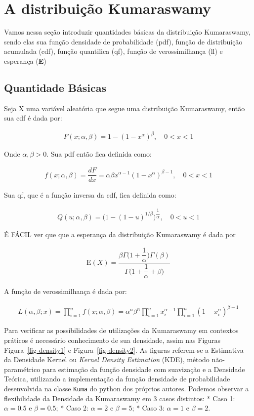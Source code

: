 \documentclass[
]{article}
\begin{document}
\section{\centering A distribuição Kumaraswamy}

Vamos nessa seção introduzir quantidades básicas da distribuição
Kumaraswamy, sendo elas sua função densidade de probabilidade (pdf),
função de distribuição acumulada (cdf), função quantilica (qf), função
de verossimilhança (ll) e esperança (\textbf{E})

\subsection{Quantidade Básicas}

Seja X uma variável aleatória que segue uma distribuição Kumaraswamy,
então sua cdf é dada por:

\begin{align}
F(x;\alpha, \beta) = 1 - (1 - x^\alpha)^\beta,  \quad 0 < x< 1
\end{align}

Onde \(\alpha, \beta > 0\). Sua pdf então fica definida como:

\begin{align}
f(x;\alpha, \beta) = \dfrac{dF}{dx} =\alpha\beta x^{\alpha - 1}(1 - x^\alpha)^{\beta  - 1}, \quad 0 < x< 1
\end{align}

Sua qf, que é a função inversa da cdf, fica definida como:

\begin{align}
Q(u;\alpha, \beta) = \bigg(1 - (1 - u)^{1/\beta}\bigg)^{\dfrac{1}{\alpha}}, \quad 0<u<1
\end{align}

É FÁCIL ver que que a esperança da distribuição Kumaraswamy é dada por

\begin{align}
\text{E}(X) = \dfrac{\beta\Gamma\bigg(1 + \dfrac{1}{\alpha}\bigg)\Gamma(\beta)}{\Gamma\bigg(1 + \dfrac{1}{\alpha} + \beta\bigg)}
\end{align}

A função de verossimilhança é dada por:

\begin{align}
L(\alpha, \beta; x) = \prod_{i=1}^{n}f(x;\alpha, \beta) = \alpha^n \beta^n \prod_{i=1}^{n}x_i^{\alpha - 1}\prod_{i=1}^{n}(1-x_i^{\alpha})^{\beta-1}
\end{align}

Para verificar as possibilidades de utilizações da Kumaraswamy em
contextos práticos é necessário conhecimento de sua densidade, assim nas
Figuras Figura~\ref{fig-density1} e Figura~\ref{fig-density2}. As
figuras referem-se a Estimativa da Densidade Kernel ou \emph{Kernel
Density Estimation} (KDE), método não-paramétrico para estimação da
função densidade com suavização e a Densidade Teórica, utilizando a
implementação da função densidade de probabilidade desenvolvida na
classe \texttt{Kuma} do python dos próprios autores. Podemos observar a
flexibilidade da Densidade da Kumaraswamy em 3 casos distintos: * Caso
1: \(\alpha = 0.5\) e \(\beta = 0.5\); * Caso 2: \(\alpha = 2\) e
\(\beta = 5\); * Caso 3: \(\alpha = 1\) e \(\beta = 2\).
\end{document}
